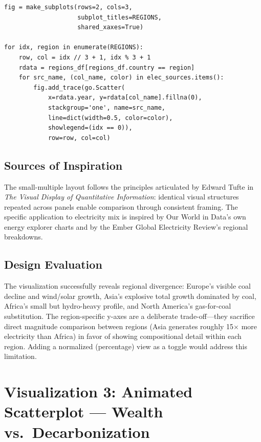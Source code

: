 \documentclass[10pt]{article}
\begin{document}
\begin{lstlisting}[caption={Small-multiple area chart construction (simplified)},label=lst:area]
fig = make_subplots(rows=2, cols=3,
                    subplot_titles=REGIONS,
                    shared_xaxes=True)

for idx, region in enumerate(REGIONS):
    row, col = idx // 3 + 1, idx % 3 + 1
    rdata = regions_df[regions_df.country == region]
    for src_name, (col_name, color) in elec_sources.items():
        fig.add_trace(go.Scatter(
            x=rdata.year, y=rdata[col_name].fillna(0),
            stackgroup='one', name=src_name,
            line=dict(width=0.5, color=color),
            showlegend=(idx == 0)),
            row=row, col=col)
\end{lstlisting}

\subsection{Sources of Inspiration}

The small-multiple layout follows the principles articulated by Edward Tufte in \emph{The Visual Display of Quantitative Information}: identical visual structures repeated across panels enable comparison through consistent framing. The specific application to electricity mix is inspired by Our World in Data's own energy explorer charts and by the Ember Global Electricity Review's regional breakdowns.

\subsection{Design Evaluation}

The visualization successfully reveals regional divergence: Europe's visible coal decline and wind/solar growth, Asia's explosive total growth dominated by coal, Africa's small but hydro-heavy profile, and North America's gas-for-coal substitution. The region-specific y-axes are a deliberate trade-off---they sacrifice direct magnitude comparison between regions (Asia generates roughly 15$\times$ more electricity than Africa) in favor of showing compositional detail within each region. Adding a normalized (percentage) view as a toggle would address this limitation.


\section{Visualization 3: Animated Scatterplot --- Wealth vs.\ Decarbonization}
\label{sec:viz3}
\end{document}
